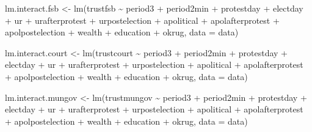\documentclass[
  letterpaper,
  DIV=11,
  numbers=noendperiod]{scrartcl}
\newenvironment{Shaded}{\begin{snugshade}}{\end{snugshade}}
\newcommand{\AttributeTok}[1]{\textcolor[rgb]{0.40,0.45,0.13}{#1}}
\newcommand{\FunctionTok}[1]{\textcolor[rgb]{0.28,0.35,0.67}{#1}}
\newcommand{\NormalTok}[1]{\textcolor[rgb]{0.00,0.23,0.31}{#1}}
\newcommand{\OtherTok}[1]{\textcolor[rgb]{0.00,0.23,0.31}{#1}}
\newcommand{\SpecialCharTok}[1]{\textcolor[rgb]{0.37,0.37,0.37}{#1}}
\begin{document}
\begin{Shaded}
\begin{Highlighting}[]
\NormalTok{lm.interact.fsb }\OtherTok{\textless{}{-}} \FunctionTok{lm}\NormalTok{(trustfsb }\SpecialCharTok{\textasciitilde{}}\NormalTok{ period3 }\SpecialCharTok{+}\NormalTok{ period2min }\SpecialCharTok{+}\NormalTok{ protestday }\SpecialCharTok{+}\NormalTok{ electday }\SpecialCharTok{+} 
\NormalTok{                                ur }\SpecialCharTok{+}\NormalTok{ urafterprotest }\SpecialCharTok{+}\NormalTok{ urpostelection }\SpecialCharTok{+} 
\NormalTok{                                apolitical }\SpecialCharTok{+}\NormalTok{ apolafterprotest }\SpecialCharTok{+}\NormalTok{ apolpostelection }\SpecialCharTok{+}
\NormalTok{                                wealth }\SpecialCharTok{+}\NormalTok{ education }\SpecialCharTok{+}\NormalTok{ okrug, }\AttributeTok{data =}\NormalTok{ data) }

\NormalTok{lm.interact.court }\OtherTok{\textless{}{-}} \FunctionTok{lm}\NormalTok{(trustcourt }\SpecialCharTok{\textasciitilde{}}\NormalTok{ period3 }\SpecialCharTok{+}\NormalTok{ period2min }\SpecialCharTok{+}\NormalTok{ protestday }\SpecialCharTok{+}\NormalTok{ electday }\SpecialCharTok{+} 
\NormalTok{                                ur }\SpecialCharTok{+}\NormalTok{ urafterprotest }\SpecialCharTok{+}\NormalTok{ urpostelection }\SpecialCharTok{+} 
\NormalTok{                                apolitical }\SpecialCharTok{+}\NormalTok{ apolafterprotest }\SpecialCharTok{+}\NormalTok{ apolpostelection }\SpecialCharTok{+}
\NormalTok{                                wealth }\SpecialCharTok{+}\NormalTok{ education }\SpecialCharTok{+}\NormalTok{ okrug, }\AttributeTok{data =}\NormalTok{ data) }

\NormalTok{lm.interact.mungov }\OtherTok{\textless{}{-}} \FunctionTok{lm}\NormalTok{(trustmungov }\SpecialCharTok{\textasciitilde{}}\NormalTok{ period3 }\SpecialCharTok{+}\NormalTok{ period2min }\SpecialCharTok{+}\NormalTok{ protestday }\SpecialCharTok{+}\NormalTok{ electday }\SpecialCharTok{+} 
\NormalTok{                                ur }\SpecialCharTok{+}\NormalTok{ urafterprotest }\SpecialCharTok{+}\NormalTok{ urpostelection }\SpecialCharTok{+} 
\NormalTok{                                apolitical }\SpecialCharTok{+}\NormalTok{ apolafterprotest }\SpecialCharTok{+}\NormalTok{ apolpostelection }\SpecialCharTok{+}
\NormalTok{                                wealth }\SpecialCharTok{+}\NormalTok{ education }\SpecialCharTok{+}\NormalTok{ okrug, }\AttributeTok{data =}\NormalTok{ data) }


\end{Highlighting}
\end{Shaded}
\end{document}
